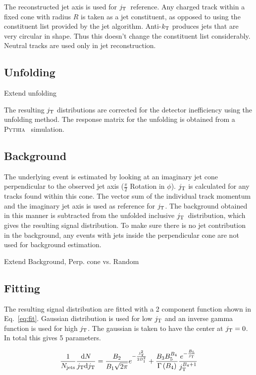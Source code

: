 The reconstructed jet axis is used for $j_{\rm T}$ reference. Any charged track within a fixed cone with radius $R$ is taken as a jet constituent, as opposed to using the constituent list provided by the jet algorithm. Anti-$k_{\rm T}$ produces jets that are very circular in shape. Thus this doesn't change the constituent list considerably. Neutral tracks are used only in jet reconstruction.
 
 \subsection{Unfolding}
{\color{red} Extend unfolding}
 
The resulting $j_{\rm T}$ distributions are corrected for the detector inefficiency using the unfolding method. The response matrix for the unfolding is obtained from a \textsc{Pythia}~\cite{introPythia81} simulation.
 

 
 \subsection{Background}

 
The underlying event is estimated by looking at an imaginary jet cone perpendicular to the observed jet axis ($\frac{\pi}{2}$ Rotation in $\phi$). $j_{\rm T}$ is calculated for any tracks found within this cone. The vector sum of the individual track momentum and the imaginary jet axis is used as reference for $j_{\rm T}$. The background obtained in this manner is subtracted from the unfolded inclusive $j_{\rm T}$ distribution, which gives the resulting signal distribution. To make sure there is no jet contribution in the background, any events with jets inside the perpendicular cone are not used for background estimation.

{\color{red} Extend Background, Perp. cone vs. Random}


 \subsection{Fitting}


The resulting signal distribution are fitted with a 2 component function shown in Eq.~\ref{eq:fit}. Gaussian distribution is used for low $j_{\rm T}$ and an inverse gamma function is used for high $j_{\rm T}$. The gaussian is taken to have the center at $j_{\rm T} = 0$. In total this gives 5 parameters.

\begin{equation}
\frac{1}{N_{\mathrm{jets}}}\frac{\mathrm{d}N}{j_{\rm T} \mathrm{d}j_{\rm T}} = \frac{B_2}{B_1\sqrt{2\pi}}e^{-\frac{j_{\rm T}^2}{2B_1^2}}+\frac{B_3B_5^{B_4}}{\Gamma\left(B_4\right)}\frac{e^{-\frac{B_5}{j_{\rm T}}}}{j_{\rm T}^{B_4+1}}
\label{eq:fit}
\end{equation}

